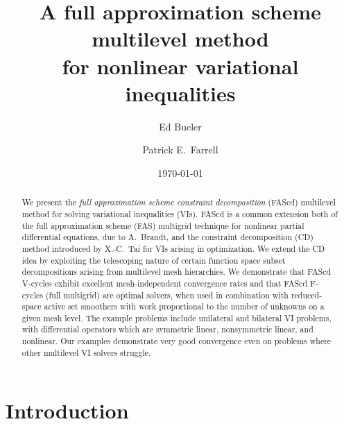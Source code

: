 \documentclass[letterpaper,final,12pt,reqno]{amsart}
\theoremstyle{cstyle}
\theoremstyle{cstyle*}
\theoremstyle{dstyle}
\numberwithin{equation}{section}
\numberwithin{figure}{section}
\numberwithin{table}{section}
\numberwithin{theorem}{section}
\begin{document}
\title[FAS for nonlinear variational inequalities]{A full approximation scheme multilevel method \\ for nonlinear variational inequalities}

\author{Ed Bueler}

\author{Patrick E.~Farrell}

\date{\today}

\begin{abstract}
We present the \emph{full approximation scheme constraint decomposition} (FAScd) multilevel method for solving variational inequalities (VIs).  FAScd is a common extension both of the full approximation scheme (FAS) multigrid technique for nonlinear partial differential equations, due to A.~Brandt, and the constraint decomposition (CD) method introduced by X.-C.~Tai for VIs arising in optimization.  We extend the CD idea by exploiting the telescoping nature of certain function space subset decompositions arising from multilevel mesh hierarchies.  We demonstrate that FAScd V-cycles exhibit excellent mesh-independent convergence rates and that FAScd F-cycles (full multigrid) are optimal solvers, when used in combination with reduced-space active set smoothers with work proportional to the number of unknowns on a given mesh level.  The example problems include unilateral and bilateral VI problems, with differential operators which are symmetric linear, nonsymmetric linear, and nonlinear.  Our examples demonstrate very good convergence even on problems where other multilevel VI solvers struggle.
\end{abstract}

\maketitle

\thispagestyle{empty}


\section{Introduction} \label{sec:intro}
\end{document}
